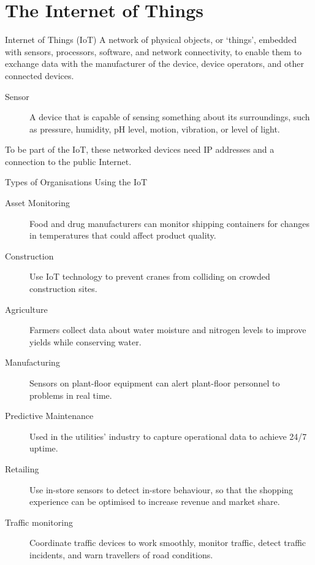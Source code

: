 \documentclass[\main/notes.tex]{subfiles}
\begin{document}
		\pagebreak
		\section{The Internet of Things}
			\begin{definition}{Internet of Things (IoT)}
				A network of physical objects, or `things', embedded with sensors, processors, software, and network connectivity, to enable them to exchange data with the manufacturer of the device, device operators, and other connected devices.
				\begin{description}
					\item[Sensor] A device that is capable of sensing something about its surroundings, such as pressure, humidity, pH level, motion, vibration, or level of light.
				\end{description}
				To be part of the IoT, these networked devices need IP addresses and a connection to the public Internet.
			\end{definition}
			\begin{sidenote}{Types of Organisations Using the IoT}
				\begin{description}
					\item[Asset Monitoring] Food and drug manufacturers can monitor shipping containers for changes in temperatures that could affect product quality.
					\item[Construction] Use IoT technology to prevent cranes from colliding on crowded construction sites.
					\item[Agriculture] Farmers collect data about water moisture and nitrogen levels to improve yields while conserving water.
					\item[Manufacturing] Sensors on plant-floor equipment can alert plant-floor personnel to problems in real time.
					\item[Predictive Maintenance] Used in the utilities' industry to capture operational data to achieve 24/7 uptime.
					\item[Retailing] Use in-store sensors to detect in-store behaviour, so that the shopping experience can be optimised to increase revenue and market share.
					\item[Traffic monitoring] Coordinate traffic devices to work smoothly, monitor traffic, detect traffic incidents, and warn travellers of road conditions.
				\end{description}
			\end{sidenote}

	\vbox{}
\end{document}
